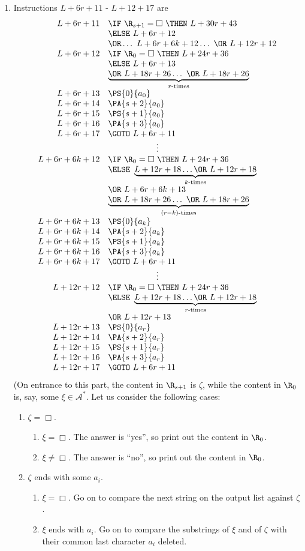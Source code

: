 \begin{enumerate}[1.]
\begin{enumerate}[(1)]
\item Instructions $L + 6r + 11$ - $L + 12 + 17$ are
\[
\begin{array}{rl}
L + 6r + 11 & \IF \ \R_{s + 1} = \Box \ \THEN \ L + 30r + 43 \cr
\ & \ELSE \ L + 6r + 12 \cr
\ & \OR \ldots \ L + 6r + 6k + 12 \ldots \ \OR \ L + 12r + 12 \cr
L + 6r + 12 & \IF \ \R_0 = \Box \ \THEN \ L + 24r + 36 \cr
\ & \ELSE \ L + 6r + 13 \cr
\ & \underbrace{\OR \ L + 18r + 26 \ldots \ \OR \ L + 18r + 26}_{r\mbox{\scriptsize-times}} \cr
L + 6r + 13 & \PS{0}{a_0} \cr
L + 6r + 14 & \PA{s + 2}{a_0} \cr
L + 6r + 15 & \PS{s + 1}{a_0} \cr
L + 6r + 16 & \PA{s + 3}{a_0} \cr
L + 6r + 17 & \GOTO \ L + 6r + 11 \cr
\multicolumn{2}{c}{\vdots} \cr
L + 6r + 6k + 12 & \IF \ \R_0 = \Box \ \THEN \ L + 24r + 36 \cr
\ & \ELSE \ \underbrace{L + 12r + 18 \ldots \OR \ L + 12r + 18}_{k\mbox{\scriptsize-times}} \cr
\ & \OR \ L + 6r + 6k + 13 \cr
\ & \underbrace{\OR \ L + 18r + 26 \ldots \ \OR \ L + 18r + 26}_{(r - k)\mbox{\scriptsize-times}} \cr
L + 6r + 6k + 13 & \PS{0}{a_k} \cr
L + 6r + 6k + 14 & \PA{s + 2}{a_k} \cr
L + 6r + 6k + 15 & \PS{s + 1}{a_k} \cr
L + 6r + 6k + 16 & \PA{s + 3}{a_k} \cr
L + 6r + 6k + 17 & \GOTO \ L + 6r + 11 \cr
\multicolumn{2}{c}{\vdots} \cr
L + 12r + 12 & \IF \ \R_0 = \Box \ \THEN \ L + 24r + 36 \cr
\ & \ELSE \ \underbrace{L + 12r + 18 \ldots \OR \ L + 12r + 18}_{r\mbox{\scriptsize-times}} \cr
\ & \OR \ L + 12r + 13 \cr
L + 12r + 13 & \PS{0}{a_r} \cr
L + 12r + 14 & \PA{s + 2}{a_r} \cr
L + 12r + 15 & \PS{s + 1}{a_r} \cr
L + 12r + 16 & \PA{s + 3}{a_r} \cr
L + 12r + 17 & \GOTO \ L + 6r + 11 \cr
\end{array}
\]
(On entrance to this part, the content in $\R_{s + 1}$ is $\zeta$, while the content in $\R_0$ is, say, some $\xi \in \mathcal{A}^\ast$. Let us consider the following cases:
\begin{enumerate}[1)]
\item $\zeta = \Box$.
\begin{enumerate}[1$^\circ$]
\item $\xi = \Box$. The answer is ``yes'', so print out the content in $\R_0$.
\item $\xi \neq \Box$. The answer is ``no'', so print out the content in $\R_0$.
\end{enumerate}
\item $\zeta$ ends with some $a_i$.
\begin{enumerate}[1$^\circ$]
\item $\xi = \Box$. Go on to compare the next string on the output list against $\zeta$.
\item $\xi$ ends with $a_i$. Go on to compare the substrings of $\xi$ and of $\zeta$ with their common last character $a_i$ deleted.

\end{enumerate}
\end{enumerate}
\end{enumerate}
\end{enumerate}

